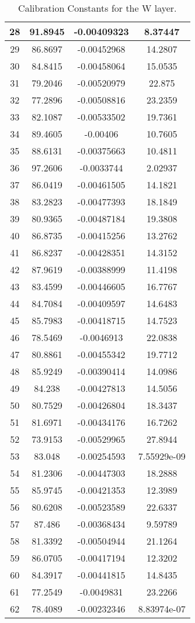 \begin{table}[h]
{\begin{tabular}{|c|c|c|c|}
28 & 91.8945 & -0.00409323 & 8.37447 \\ \hline 
29 & 86.8697 & -0.00452968 & 14.2807 \\ \hline 
30 & 84.8415 & -0.00458064 & 15.0535 \\ \hline 
31 & 79.2046 & -0.00520979 & 22.875 \\ \hline 
32 & 77.2896 & -0.00508816 & 23.2359 \\ \hline 
33 & 82.1087 & -0.00533502 & 19.7361 \\ \hline 
34 & 89.4605 & -0.00406 & 10.7605 \\ \hline 
35 & 88.6131 & -0.00375663 & 10.4811 \\ \hline 
36 & 97.2606 & -0.0033744 & 2.02937 \\ \hline 
37 & 86.0419 & -0.00461505 & 14.1821 \\ \hline 
38 & 83.2823 & -0.00477393 & 18.1849 \\ \hline 
39 & 80.9365 & -0.00487184 & 19.3808 \\ \hline 
40 & 86.8735 & -0.00415256 & 13.2762 \\ \hline 
41 & 86.8237 & -0.00428351 & 14.3152 \\ \hline 
42 & 87.9619 & -0.00388999 & 11.4198 \\ \hline 
43 & 83.4599 & -0.00446605 & 16.7767 \\ \hline 
44 & 84.7084 & -0.00409597 & 14.6483 \\ \hline 
45 & 85.7983 & -0.00418715 & 14.7523 \\ \hline 
46 & 78.5469 & -0.0046913 & 22.0838 \\ \hline 
47 & 80.8861 & -0.00455342 & 19.7712 \\ \hline 
48 & 85.9249 & -0.00390414 & 14.0986 \\ \hline 
49 & 84.238 & -0.00427813 & 14.5056 \\ \hline 
50 & 80.7529 & -0.00426804 & 18.3437 \\ \hline 
51 & 81.6971 & -0.00434176 & 16.7262 \\ \hline 
52 & 73.9153 & -0.00529965 & 27.8944 \\ \hline 
53 & 83.048 & -0.00254593 & 7.55929e-09 \\ \hline 
54 & 81.2306 & -0.00447303 & 18.2888 \\ \hline 
55 & 85.9745 & -0.00421353 & 12.3989 \\ \hline 
56 & 80.6208 & -0.00523589 & 22.6337 \\ \hline 
57 & 87.486 & -0.00368434 & 9.59789 \\ \hline 
58 & 81.3392 & -0.00504944 & 21.1264 \\ \hline 
59 & 86.0705 & -0.00417194 & 12.3202 \\ \hline 
60 & 84.3917 & -0.00441815 & 14.8435 \\ \hline 
61 & 77.2549 & -0.0049831 & 23.2266 \\ \hline 
62 & 78.4089 & -0.00232346 & 8.83974e-07 \\ \hline  
        \end{tabular}
        }
        \caption{Calibration Constants for the W layer.}
        \label{tab:WattenCSimulation}
\end{table}
\FloatBarrier
